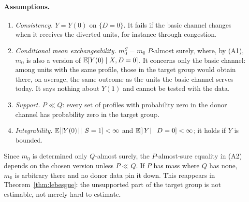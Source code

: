 \paragraph{Assumptions.}
\begin{enumerate}[label=(A\arabic*)]
  \item \emph{Consistency.} $Y=Y(0)$ on $\{D=0\}$. It fails if the basic channel changes when it receives the diverted units, for instance through congestion.
  \item \emph{Conditional mean exchangeability.} $m_0^S=m_0$ $P$-almost surely, where, by (A1), $m_0$ is also a version of $\mathbb{E}[Y(0)\mid X,D=0]$. It concerns only the basic channel: among units with the same profile, those in the target group would obtain there, on average, the same outcome as the units the basic channel serves today. It says nothing about $Y(1)$ and cannot be tested with the data.
  \item \emph{Support.} $P\ll Q$: every set of profiles with probability zero in the donor channel has probability zero in the target group.
  \item \emph{Integrability.} $\mathbb{E}[|Y(0)|\mid S=1]<\infty$ and $\mathbb{E}[|Y|\mid D=0]<\infty$; it holds if $Y$ is bounded.
\end{enumerate}

\begin{remark}[A2 presupposes A3]\label{rem:a2a3}
Since $m_0$ is determined only $Q$-almost surely, the $P$-almost-sure equality in (A2) depends on the chosen version unless $P\ll Q$. If $P$ has mass where $Q$ has none, $m_0$ is arbitrary there and no donor data pin it down. This reappears in Theorem~\ref{thm:lebesgue}: the unsupported part of the target group is not estimable, not merely hard to estimate.
\end{remark}

